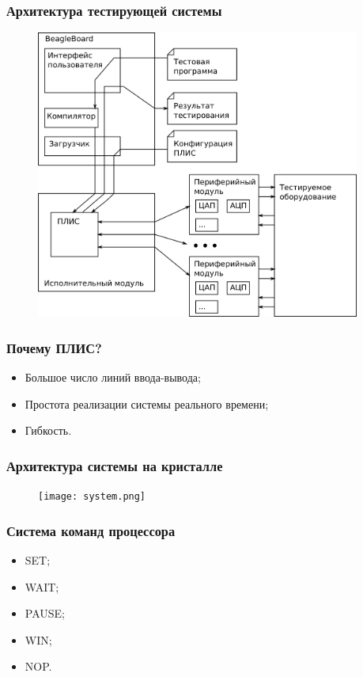 \documentclass{beamer}
\begin{document}
\begin{frame}
\frametitle{Архитектура тестирующей системы}
\begin{figure}
\includegraphics[width=0.95\textwidth,height=0.8\textheight,keepaspectratio]{arch.png}
\end{figure}
\end{frame}


\begin{frame}
\frametitle{Почему ПЛИС?}
\begin{itemize}
\item Большое число линий ввода-вывода;
\item Простота реализации системы реального времени;
\item Гибкость.
\end{itemize}
\end{frame}


\begin{frame}
\frametitle{Архитектура системы на кристалле}
\begin{figure}
\texttt{[image: system.png]}
\end{figure}
\end{frame}


\begin{frame}
\frametitle{Система команд процессора}
\begin{itemize}
\item SET;
\item WAIT;
\item PAUSE;
\item WIN;
\item NOP.
\end{itemize}
\end{frame}
\end{document}

